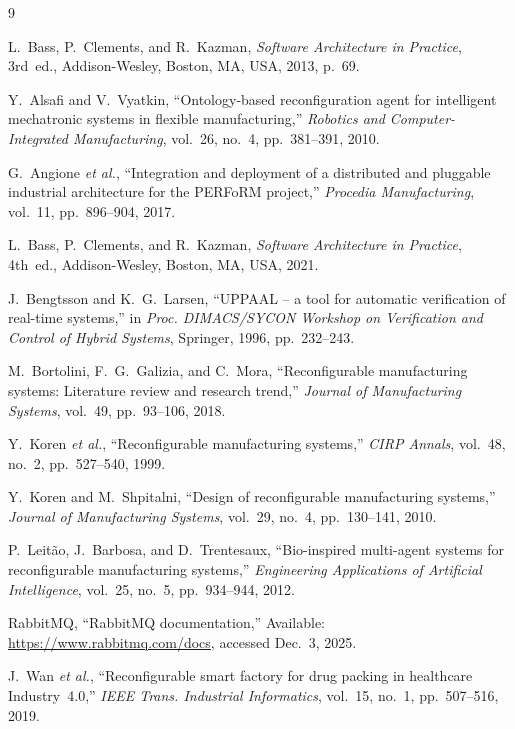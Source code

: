 \documentclass[conference]{IEEEtran}
\begin{document}
\vspace{12pt}

\begin{thebibliography}{9}

L.~Bass, P.~Clements, and R.~Kazman,
\textit{Software Architecture in Practice},
3rd~ed.,
Addison-Wesley, Boston, MA, USA, 2013, p.~69.

Y.~Alsafi and V.~Vyatkin,
``Ontology-based reconfiguration agent for intelligent mechatronic systems in flexible manufacturing,''
\textit{Robotics and Computer-Integrated Manufacturing},
vol.~26, no.~4, pp.~381--391, 2010.

G.~Angione \textit{et al.},
``Integration and deployment of a distributed and pluggable industrial architecture for the PERFoRM project,''
\textit{Procedia Manufacturing},
vol.~11, pp.~896--904, 2017.

L.~Bass, P.~Clements, and R.~Kazman,
\textit{Software Architecture in Practice},
4th~ed.,
Addison-Wesley, Boston, MA, USA, 2021.

J.~Bengtsson and K.~G.~Larsen,
``UPPAAL -- a tool for automatic verification of real-time systems,''
in \textit{Proc. DIMACS/SYCON Workshop on Verification and Control of Hybrid Systems},
Springer, 1996, pp.~232--243.

M.~Bortolini, F.~G.~Galizia, and C.~Mora,
``Reconfigurable manufacturing systems: Literature review and research trend,''
\textit{Journal of Manufacturing Systems},
vol.~49, pp.~93--106, 2018.

Y.~Koren \textit{et al.},
``Reconfigurable manufacturing systems,''
\textit{CIRP Annals},
vol.~48, no.~2, pp.~527--540, 1999.

Y.~Koren and M.~Shpitalni,
``Design of reconfigurable manufacturing systems,''
\textit{Journal of Manufacturing Systems},
vol.~29, no.~4, pp.~130--141, 2010.

P.~Leit\~ao, J.~Barbosa, and D.~Trentesaux,
``Bio-inspired multi-agent systems for reconfigurable manufacturing systems,''
\textit{Engineering Applications of Artificial Intelligence},
vol.~25, no.~5, pp.~934--944, 2012.

RabbitMQ,
``RabbitMQ documentation,''
Available: \url{https://www.rabbitmq.com/docs},
accessed Dec.~3, 2025.

J.~Wan \textit{et al.},
``Reconfigurable smart factory for drug packing in healthcare Industry~4.0,''
\textit{IEEE Trans. Industrial Informatics},
vol.~15, no.~1, pp.~507--516, 2019.


\end{thebibliography}
\end{document}

